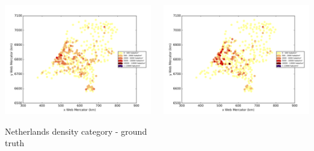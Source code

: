 \documentclass[c]{beamer}
\begin{document}
\begin{frame}
\begin{columns}
 \begin{column}{0.5\textwidth}
  \begin{overlayarea}{\linewidth}{4cm}
    \centering\vfill
    \includegraphics[scale=0.50]{images/Netherlands/density_ground_truth.png}
  \end{overlayarea}
  \begin{overlayarea}{\linewidth}{0.5cm}
    \centering
    \tiny Netherlands density category - ground truth\par
  \end{overlayarea}
 \end{column}
 \begin{column}{0.5\textwidth}
  \begin{overlayarea}{\linewidth}{4cm}
    \centering\vfill
    \includegraphics[scale=0.50]{images/Netherlands/nn/density_classification.png}

\end{overlayarea}
\end{column}
\end{columns}
\end{frame}
\end{document}
